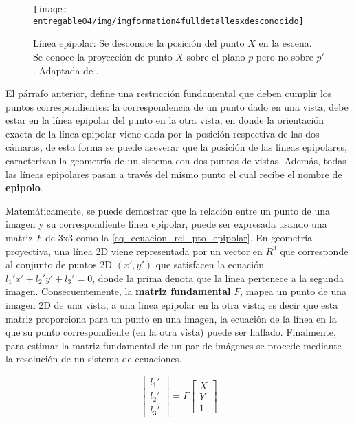 \documentclass[a4paper,11pt,spanish]{article}
\begin{document}
\begin{figure}[tbhp]
\centerline{\texttt{[image: entregable04/img/imgformation4fulldetallesxdesconocido]}}
\caption{Línea epipolar: Se desconoce la posición del punto $X$ en la escena. Se conoce la proyección de punto $X$ sobre el plano $p$ pero no sobre $p'$. Adaptada de \cite{citeulike:9456628}.}
\label{imgformation4fulldetallesxdesconocido}
\end{figure}

El párrafo anterior, define una restricción fundamental que deben cumplir los puntos correspondientes: la correspondencia de un punto dado en una vista, debe estar en la línea epipolar del punto en la otra vista, en donde la orientación exacta de la línea epipolar viene dada por la posición respectiva de las dos cámaras, de esta forma se puede aseverar que la posición de las líneas epipolares, caracterizan la geometría de un sistema con dos puntos de vistas. Además, todas las líneas epipolares pasan a través del mismo punto el cual recibe el nombre de \textbf{epipolo}.

Matemáticamente, se puede demostrar \cite{citeulike:9456628} que la relación entre un punto de una imagen y su correspondiente línea epipolar, puede ser expresada usando una matriz $F$ de 3x3 como la \eqref{eq_ecuacion_rel_pto_epipolar}. En geometría proyectiva, una línea 2D viene representada por un vector en $R^3$ que corresponde al conjunto de puntos 2D $(x',y')$ que satisfacen la ecuación $l_1'x'+l_2'y'+l_3'=0$, donde la prima denota que la línea pertenece a la segunda imagen. Consecuentemente, la \textbf{matriz fundamental} $F$, mapea un punto de una imagen 2D de una vista, a una linea epipolar en la otra vista; es decir que esta matriz proporciona para un punto en una imagen, la ecuación de la línea en la que su punto correspondiente (en la otra vista) puede ser hallado.
Finalmente, para estimar la matriz fundamental de un par de imágenes se procede mediante la resolución de un sistema de ecuaciones.

\begin{equation}
  \begin{bmatrix} l_1' \\
  l_2'\\
  l_3'
  \end{bmatrix}=F
  \begin{bmatrix}
  X\\
  Y\\
  1
  \end{bmatrix}
  \label{eq_ecuacion_rel_pto_epipolar}
\end{equation}
\end{document}
